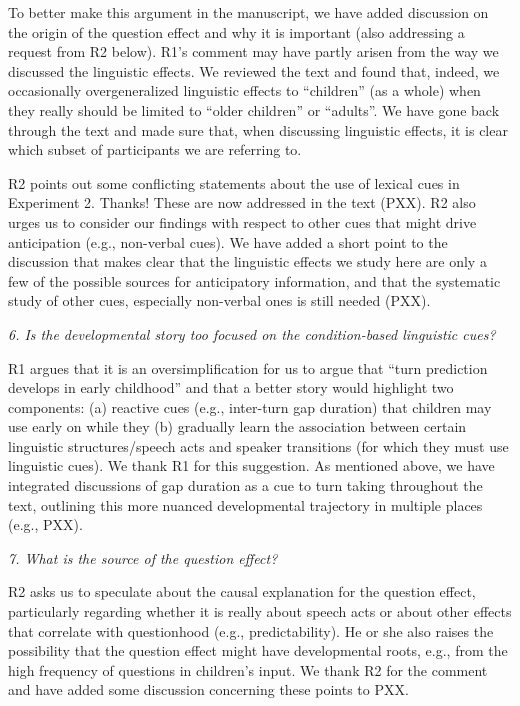 \documentclass[11pt,a4paper]{letter} %
\begin{document}
\begin{letter}{}
\noindent To better make this argument in the manuscript, we have added discussion on the origin of the question effect and why it is important (also addressing a request from R2 below). R1's comment may have partly arisen from the way we discussed the linguistic effects. We reviewed the text and found that, indeed, we occasionally overgeneralized linguistic effects to ``children'' (as a whole) when they really should be limited to ``older children'' or ``adults''. We have gone back through the text and made sure that, when discussing linguistic effects, it is clear which subset of participants we are referring to.

\noindent R2 points out some conflicting statements about the use of lexical cues in Experiment 2. Thanks! These are now addressed in the text (PXX). R2 also urges us to consider our findings with respect to other cues that might drive anticipation (e.g., non-verbal cues). We have added a short point to the discussion that makes clear that the linguistic effects we study here are only a few of the possible sources for anticipatory information, and that the systematic study of other cues, especially non-verbal ones is still needed (PXX).

\noindent \textit{6. Is the developmental story too focused on the condition-based linguistic cues?}

\noindent R1 argues that it is an oversimplification for us to argue that ``turn prediction develops in early childhood'' and that a better story would highlight two components: (a) reactive cues (e.g., inter-turn gap duration) that children may use early on while they (b) gradually learn the association between certain linguistic structures/speech acts and speaker transitions (for which they must use linguistic cues). We thank R1 for this suggestion. As mentioned above, we have integrated discussions of gap duration as a cue to turn taking throughout the text, outlining this more nuanced developmental trajectory in multiple places (e.g., PXX).

\noindent \textit{7. What is the source of the question effect?}

\noindent R2 asks us to speculate about the causal explanation for the question effect, particularly regarding whether it is really about speech acts or about other effects that correlate with questionhood (e.g., predictability). He or she also raises the possibility that the question effect might have developmental roots, e.g., from the high frequency of questions in children's input. We thank R2 for the comment and have added some discussion concerning these points to PXX.


\end{letter}
\end{document}
